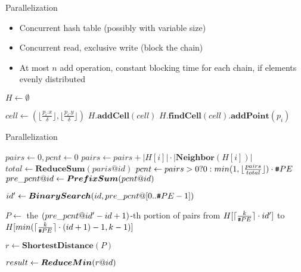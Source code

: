 \documentclass[18pt]{beamer}
\begin{document}
\begin{frame}{Parallelization}
\begin{itemize}
\item Concurrent hash table (possibly with variable size)
\item Concurrent read, exclusive write (block the chain)
\item At most $n$ add operation, constant blocking time for each chain, if elements evenly distributed
\end{itemize}
\begin{algorithmic}[1]
\State $H \gets \emptyset$
	
\State $cell \gets (\lfloor \frac{p_i.x}{\delta}\rfloor,\lfloor \frac{p_i.y}{\delta}\rfloor )$ 
	\State $H.\boldsymbol{addCell}(cell)$ 
\EndIf
\State $H.\boldsymbol{findCell}(cell).\boldsymbol{addPoint}(p_i)$
\EndFor
\EndProcedure
\end{algorithmic}

\end{frame}

\begin{frame}{Parallelization}
\begin{algorithmic}[1]
\State $pairs \gets 0, pcnt \gets 0$
	\State $pairs \gets pairs + |H[i]| \cdot |\boldsymbol{Neighbor}(H[i])|$
\EndFor
\State $total \gets \boldsymbol{ReduceSum}(paris@id)$ 
\State $pcnt \gets pairs > 0 ? 0 : min (1, \lfloor \frac{pairs}{total} \rfloor) \cdot \texttt{\#} PE$
\State $pre\_pcnt \text{@} id \gets \boldsymbol{PrefixSum}(pcnt \text{@} id)$

\State $id' \gets \boldsymbol{BinarySearch}(id, pre\_pcnt \text{@} [0..\texttt{\#} PE-1])$  

\State $P \gets$ the $(pre\_pcnt \text{@} id' - id + 1)$-th portion of pairs from $H[\lceil \frac{k}{\texttt{\#} PE} \rceil\cdot id']$ to $H[min ( \lceil \frac{k}{\texttt{\#} PE} \rceil \cdot (id + 1) - 1, k-1)]$  

\State $r \gets \boldsymbol{ShortestDistance}(P)$ 

\State $result \gets \boldsymbol{ReduceMin}(r \text{@} id)$ 

\EndProcedure
\end{algorithmic}
\end{frame}
\end{document}
